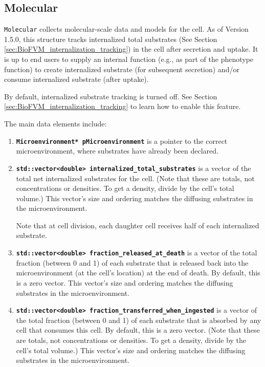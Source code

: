 \documentclass[12pt]{article}
\renewcommand{\v}{\verb}
\newcommand{\smallcode}[1]{\textbf{\texttt{#1}}}
\begin{document}
\subsection{Molecular}
\label{sec:phenotype_molecular}
\v|Molecular| collects molecular-scale data and models for the cell. As of Version 1.5.0, 
this structure tracks internalized total substrates 
(See Section \ref{sec:BioFVM_internalization_tracking}) in the cell after secretion and 
uptake. It is up to end users to supply an internal function (e.g., as part of the phenotype function) to 
create internalized substrate (for subsequent secretion) and/or consume internalized substrate (after 
uptake). 

By default, internalized substrate tracking is turned off. See Section 
\ref{sec:BioFVM_internalization_tracking} to learn how to enable this feature. 

The main data elements include:
\begin{enumerate}
\item
\smallcode{Microenvironment* pMicroenvironment} is a pointer to the 
correct microenvironment, where substrates have already been declared. 
 
\item 
\smallcode{std::vector<double> internalized\_total\_substrates} is a 
vector of the total net internalized substrates for the cell. 
(Note that these are totals, not concentrations or densities. To get a 
density, divide by the cell's total volume.) This vector's size and ordering 
matches the diffusing substrates in the microenvironment. 

Note that at cell division, each daughter cell receives half of each 
internalized substrate. 

\item 
\smallcode{std::vector<double> fraction\_released\_at\_death} is a 
vector of the total fraction (between 0 and 1) of each substrate 
that is released back into the microenvironment (at the cell's location)
at the end of death. By default, this is a zero vector. 
This vector's size and ordering 
matches the diffusing substrates in the microenvironment. 

\item 
\smallcode{std::vector<double> fraction\_transferred\_when\_ingested} is a 
vector of the total fraction (between 0 and 1) of each substrate 
that is absorbed by any cell that consumes this cell. By default, this is a 
zero vector. (Note that these are totals, not concentrations or densities. To get a 
density, divide by the cell's total volume.) This vector's size and ordering 
matches the diffusing substrates in the microenvironment. 
\end{enumerate}
\end{document}
